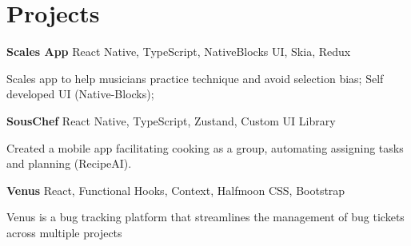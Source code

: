 
\newenvironment{twocolentry_proj}[2][]{
    \onecolentry
    \def\secondColumn{#2}
    \setcolumnwidth{\fill, 7 cm}
    \begin{paracol}{2}
        }{
            \switchcolumn \raggedleft \secondColumn
        \end{paracol}
        \endonecolentry
        } %
        
\vspace{5 pt - 0.5 cm}
\section{Projects}

\vspace{0.10 cm}
\begin{twocolentry_proj}{
    \mbox{}%
    }
    \fontsize{11 pt}{11 pt}\textbf{Scales App} React Native, TypeScript, NativeBlocks UI, Skia, Redux
\end{twocolentry_proj}
\begin{onecolentry}
    \begin{highlights}
        \item Scales app to help musicians practice technique and avoid selection bias; Self developed UI (Native-Blocks);
    \end{highlights}
\end{onecolentry}
        
\vspace{0.10 cm}
\begin{twocolentry_proj}{
    \mbox{}%
    }
    \fontsize{11 pt}{11 pt}\textbf{SousChef} React Native, TypeScript, Zustand, Custom UI Library  
\end{twocolentry_proj}
\begin{onecolentry}
    \begin{highlights}
        \item Created a mobile app facilitating cooking as a group, automating assigning tasks and planning (RecipeAI).
    \end{highlights}
\end{onecolentry}


\begin{twocolentry_proj}{
    \mbox{}%
}
\fontsize{11 pt}{11 pt}\textbf{Venus} React, Functional Hooks, Context, Halfmoon CSS, Bootstrap
\end{twocolentry_proj}

\begin{onecolentry}
    \begin{highlights}
        \item Venus is a bug tracking platform that streamlines the management of bug tickets across multiple projects
    \end{highlights}
\end{onecolentry}